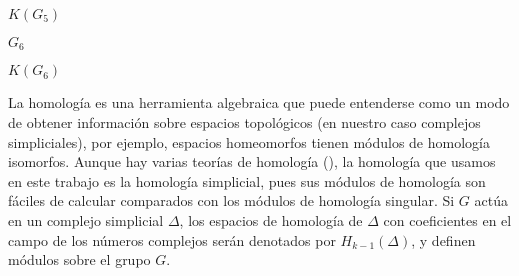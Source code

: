 \documentclass[12pt]{book}
\theoremstyle{definition}
\newcounter{in}
\newcounter{ini}
\begin{document}
\begin{center}
\begin{minipage}{0.33\linewidth}
  $K(G_{5})$
\end{minipage}
\bigskip
  
\begin{minipage}{0.33\linewidth}
  \centering
  
  $G_{6}$
\end{minipage}\quad
\begin{minipage}{.33\linewidth}
  \centering
  
  $K(G_{6})$
\end{minipage}
\end{center}

La homología es una herramienta algebraica que puede entenderse como
un modo de obtener información sobre espacios topológicos (en nuestro
caso complejos simpliciales), por
ejemplo, espacios homeomorfos tienen módulos de homología
isomorfos. Aunque hay varias teorías de homología
(\cite[\S 26]{munkres1984elements}), la homología que
usamos en este trabajo es la homología simplicial, pues sus módulos
de homología son fáciles de calcular comparados con los módulos de
homología singular. 
Si $G$ actúa en un complejo simplicial $\Delta$, los espacios de homología de $\Delta$ con coeficientes en el campo de los números
complejos serán denotados por $H_{k-1}(\Delta)$, y definen módulos sobre el grupo $G$.
\end{document}
